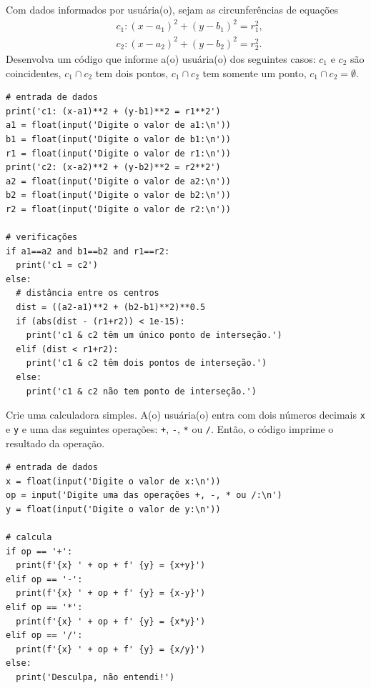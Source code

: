 \begin{exer}
  Com dados informados por usuária(o), sejam as circunferências de equações
  \begin{align}
    & c_1: (x-a_1)^2 + (y-b_1)^2 = r_1^2, \\
    & c_2: (x-a_2)^2 + (y-b_2)^2 = r_2^2.
  \end{align}
  Desenvolva um código que informe a(o) usuária(o) dos seguintes casos: $c_1$ e $c_2$ são coincidentes, $c_1\cap c_2$ tem dois pontos, $c_1\cap c_2$ tem somente um ponto, $c_1\cap c_2 = \emptyset$.
\end{exer}
\begin{resp}

\begin{lstlisting}
# entrada de dados
print('c1: (x-a1)**2 + (y-b1)**2 = r1**2')
a1 = float(input('Digite o valor de a1:\n'))
b1 = float(input('Digite o valor de b1:\n'))
r1 = float(input('Digite o valor de r1:\n'))
print('c2: (x-a2)**2 + (y-b2)**2 = r2**2')
a2 = float(input('Digite o valor de a2:\n'))
b2 = float(input('Digite o valor de b2:\n'))
r2 = float(input('Digite o valor de r2:\n'))

# verificações
if a1==a2 and b1==b2 and r1==r2:
  print('c1 = c2')
else:
  # distância entre os centros
  dist = ((a2-a1)**2 + (b2-b1)**2)**0.5
  if (abs(dist - (r1+r2)) < 1e-15):
    print('c1 & c2 têm um único ponto de interseção.')
  elif (dist < r1+r2):
    print('c1 & c2 têm dois pontos de interseção.')
  else:
    print('c1 & c2 não tem ponto de interseção.')
\end{lstlisting}

\end{resp}

\begin{exer}
  Crie uma calculadora simples. A(o) usuária(o) entra com dois números decimais \lstinline+x+ e \lstinline+y+ e uma das seguintes operações: \lstinline!+!, \lstinline+-+, \lstinline+*+ ou \lstinline+/+. Então, o código imprime o resultado da operação.
\end{exer}
\begin{resp}

\begin{lstlisting}
# entrada de dados
x = float(input('Digite o valor de x:\n'))
op = input('Digite uma das operações +, -, * ou /:\n')
y = float(input('Digite o valor de y:\n'))

# calcula
if op == '+':
  print(f'{x} ' + op + f' {y} = {x+y}')
elif op == '-':
  print(f'{x} ' + op + f' {y} = {x-y}')
elif op == '*':
  print(f'{x} ' + op + f' {y} = {x*y}')
elif op == '/':
  print(f'{x} ' + op + f' {y} = {x/y}')
else:
  print('Desculpa, não entendi!')
\end{lstlisting}

\end{resp}

